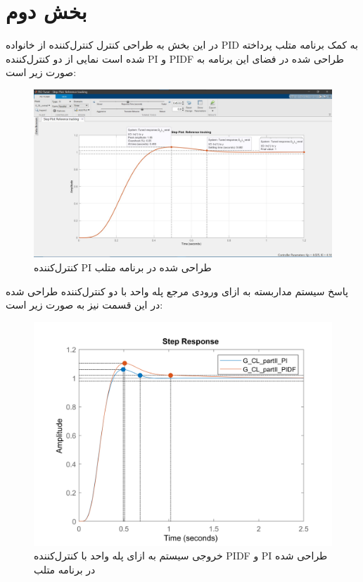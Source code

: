 \chapter{بخش دوم}
در این بخش به طراحی کنترل کنترل‌کننده از خانواده  PID به کمک برنامه   متلب پرداخته شده است نمایی از دو کنترل‌کننده PI  و PIDF طراحی شده در فضای این برنامه به صورت زیر است:
\begin{figure}[H]
	\centering
	\includegraphics[width=12cm]{../Figure/P_II/controller_PIDtuner__partII_PI.jpg}
	\caption{کنترل‌کننده PI طراحی شده در برنامه  متلب}
\end{figure}


پاسخ سیستم مداربسته به ازای ورودی مرجع پله واحد با دو کنترل‌کننده طراحی شده در این قسمت نیز به صورت زیر است:
\begin{figure}[H]
	\centering
	\includegraphics[width=12cm]{../Figure/P_II/PID_tunner.png}
	\caption{خروجی سیستم به ازای پله واحد با کنترل‌کننده PIDF و PI طراحی شده در برنامه  متلب}
\end{figure}



